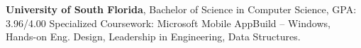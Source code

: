 %
%

\begin{scholarship}
					{\textbf{University of South Florida}, Bachelor of Science in Computer Science, GPA: 3.96/4.00 \newline Specialized Coursework: Microsoft Mobile AppBuild – Windows, Hands-on Eng. Design, Leadership in Engineering, Data Structures.}
\end{scholarship}